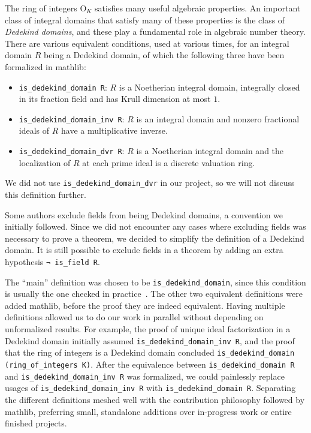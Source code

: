 \documentclass[a4paper,USenglish,cleveref, autoref, thm-restate]{lipics-v2021}
\newcommand{\lean}[1]{\texttt{#1}\xspace} %
\newcommand{\OK}{\mathrm{O}_K}
\newcommand{\mathlib}{\textsf{mathlib}\xspace}
\begin{document}
The ring of integers $\OK$ satisfies many useful algebraic properties.
An important class of integral domains that satisfy many of these properties is the class of \emph{Dedekind domains},
and these play a fundamental role in algebraic number theory.
There are various equivalent conditions, used at various times, for an integral domain $R$ being a Dedekind domain,
of which the following three have been formalized in \mathlib:
\begin{itemize}
\item \lean{is\_dedekind\_domain R}: $R$ is a Noetherian integral domain, integrally closed in its fraction field and has Krull dimension at most $1$.
\item \lean{is\_dedekind\_domain\_inv R}: $R$ is an integral domain and nonzero fractional ideals of $R$ have a multiplicative inverse.
\item \lean{is\_dedekind\_domain\_dvr R}: $R$ is a Noetherian integral domain and the localization of $R$ at each prime ideal is a discrete valuation ring.
\end{itemize}
We did not use \lean{is\_dedekind\_domain\_dvr} in our project, so we will not discuss this definition further.

Some authors exclude fields from being Dedekind domains, a convention we initially followed.
Since we did not encounter any cases where excluding fields was necessary to prove a theorem,
we decided to simplify the definition of a Dedekind domain.
It is still possible to exclude fields in a theorem by adding an extra hypothesis \lean{¬ is\_field R}.

The ``main'' definition was chosen to be \lean{is\_dedekind\_domain},
since this condition is usually the one checked in practice~\cite{Neukirch}.
The other two equivalent definitions were added \mathlib, before the proof they are indeed equivalent.
Having multiple definitions allowed us to do our work in parallel without depending on unformalized results.
For example,
the proof of unique ideal factorization in a Dedekind domain initially assumed \lean{is\_dedekind\_domain\_inv R},
and the proof that the ring of integers is a Dedekind domain concluded \lean{is\_dedekind\_domain (ring\_of\_integers K)}.
After the equivalence between \lean{is\_dedekind\_domain R} and \lean{is\_dedekind\_domain\_inv R} was formalized,
we could painlessly replace usages of \lean{is\_dedekind\_domain\_inv R} with \lean{is\_dedekind\_domain R}.
Separating the different definitions meshed well with the contribution philosophy followed by \mathlib, preferring small, standalone additions over in-progress work or entire finished projects.
\end{document}
